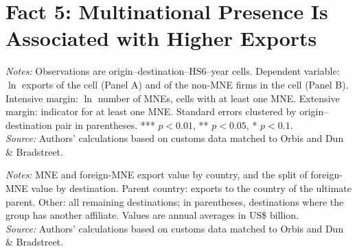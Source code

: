 \documentclass[11pt,a4paper]{article}
\begin{document}
\section{Fact 5: Multinational Presence Is Associated with Higher Exports}\label{sec:f5_all}
\begin{table}[H]\centering\small%
  \caption{Multinational Presence and Exports}%
  \label{tab:t1_all}%
  \par\vspace{3pt}%
  \begin{minipage}{0.95\textwidth}\footnotesize %
  \textit{Notes:} Observations are origin--destination--HS6--year cells. Dependent variable: $\ln$ exports of the cell (Panel A) and of the non-MNE firms in the cell (Panel B). Intensive margin: $\ln$ number of MNEs, cells with at least one MNE. Extensive margin: indicator for at least one MNE. Standard errors clustered by origin--destination pair in parentheses. *** $p<0.01$, ** $p<0.05$, * $p<0.1$.\\[3pt]%
  \textit{Source:} Authors' calculations based on customs data matched to Orbis and Dun \& Bradstreet.%
  \end{minipage}%
  \end{table}
\begin{table}[H]\centering\small%
  \caption{Multinational Exports by Exporting Country and Destination Type}%
  \label{tab:pres_all}%
  \par\vspace{3pt}%
  \begin{minipage}{0.95\textwidth}\footnotesize %
  \textit{Notes:} MNE and foreign-MNE export value by country, and the split of foreign-MNE value by destination. Parent country: exports to the country of the ultimate parent. Other: all remaining destinations; in parentheses, destinations where the group has another affiliate. Values are annual averages in US\$ billion.\\[3pt]%
  \textit{Source:} Authors' calculations based on customs data matched to Orbis and Dun \& Bradstreet.%
  \end{minipage}%
  \end{table}
\end{document}
